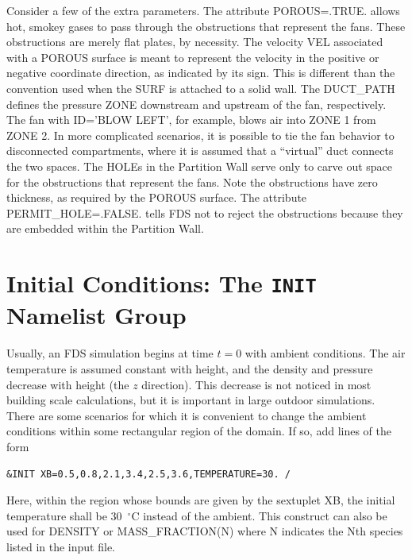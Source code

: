 \documentclass[11pt]{book}
\begin{document}
\noindent
Consider a few of the extra parameters. The attribute {\ct POROUS=.TRUE.} allows hot, smokey gases to pass through the obstructions that represent the fans. These obstructions
are merely flat plates, by necessity. The velocity {\ct VEL} associated with a {\ct POROUS} surface is meant to represent the velocity in the positive or negative coordinate
direction, as indicated by its sign. This is different than the convention used when the {\ct SURF} is attached to a solid wall. The {\ct DUCT\_PATH} defines the pressure
{\ct ZONE} downstream and upstream of the fan, respectively. The fan with {\ct ID='BLOW LEFT'}, for example, blows air into {\ct ZONE} 1 from {\ct ZONE} 2.
In more complicated scenarios,
it is possible to tie the fan behavior to disconnected compartments, where it is assumed that a ``virtual'' duct connects the two spaces. The {\ct HOLE}s in the Partition Wall serve
only to carve out space for the obstructions that represent the fans. Note the obstructions have zero thickness, as required by the {\ct POROUS} surface. The attribute
{\ct PERMIT\_HOLE=.FALSE.} tells FDS not to reject the obstructions because they are embedded within the Partition Wall.




\section{Initial Conditions: The \texorpdfstring{{\tt INIT}}{INIT} Namelist Group}
\label{info:INIT}

Usually, an FDS simulation begins at time $t=0$ with ambient conditions. The air temperature is
assumed constant with height, and the density and pressure decrease with height (the $z$ direction). This
decrease is not noticed in most building scale calculations, but it is important in large outdoor
simulations. There are some scenarios for which it is convenient to change the ambient conditions within some
rectangular region of the domain. If so, add lines of the form

\footnotesize
\begin{verbatim}
&INIT XB=0.5,0.8,2.1,3.4,2.5,3.6,TEMPERATURE=30. /
\end{verbatim}
\normalsize
Here, within the region whose bounds are given by the sextuplet {\ct XB},
the initial temperature shall be 30~$^\circ$C instead of the ambient.
This construct can also be used for {\ct DENSITY} or
{\ct MASS\_FRACTION(N)} where {\ct N} indicates the {\ct N}th species listed in the input file.
\end{document}
